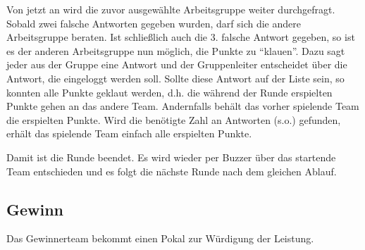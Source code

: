 \documentclass{scrartcl}
\begin{document}
Von jetzt an wird die zuvor ausgewählte Arbeitsgruppe weiter durchgefragt. Sobald zwei falsche Antworten gegeben wurden, darf sich die andere Arbeitsgruppe beraten. Ist schließlich auch die 3. falsche Antwort gegeben, so ist es der anderen Arbeitsgruppe nun möglich, die Punkte zu "`klauen"'. Dazu sagt jeder aus der Gruppe eine Antwort und der Gruppenleiter entscheidet über die Antwort, die eingeloggt werden soll. Sollte diese Antwort auf der Liste sein, so konnten alle Punkte geklaut werden, d.h. die während der Runde erspielten Punkte gehen an das andere Team. Andernfalls behält das vorher spielende Team die erspielten Punkte. Wird die benötigte Zahl an Antworten (s.o.) gefunden, erhält das spielende Team einfach alle erspielten Punkte.

Damit ist die Runde beendet. Es wird wieder per Buzzer über das startende Team entschieden und es folgt die nächste Runde nach dem gleichen Ablauf.

\subsection*{Gewinn}
Das Gewinnerteam bekommt einen Pokal zur Würdigung der Leistung.
\end{document}
